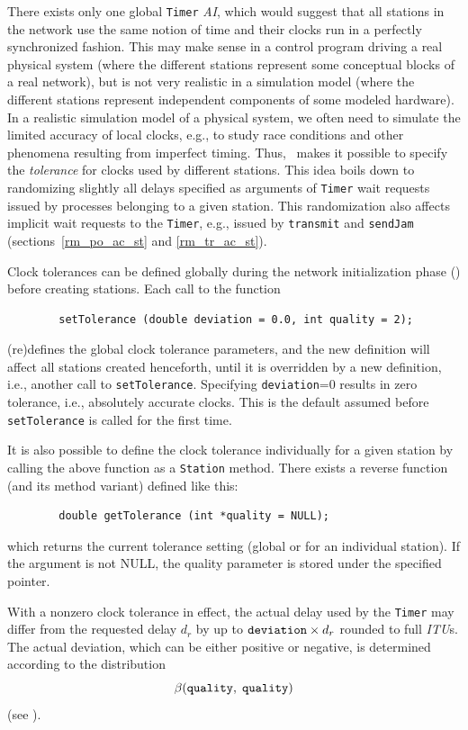 There exists only one global {\tt Timer} {\em AI}, which would suggest that all
stations in the network use the same notion of time and their clocks run
in a perfectly synchronized fashion.
This may make sense in a control program driving a real physical system
(where the different stations represent some conceptual blocks of a real
network),
but is not very realistic in a simulation model (where the different stations
represent independent components of some modeled hardware).
In a realistic simulation model of a physical system, we often need to
simulate the limited accuracy of local clocks, e.g., to study race
conditions and other phenomena resulting from imperfect timing.
Thus, \smurph\ makes it possible to specify the {\em tolerance\/} for clocks
used by different stations.
This idea boils down to randomizing slightly all delays specified as
arguments of {\tt Timer} wait requests issued by processes belonging to a
given station.
This randomization also affects implicit wait requests to the {\tt Timer},
e.g., issued by {\tt transmit} and {\tt sendJam}
(sections~\ref{rm_po_ac_st} and \ref{rm_tr_ac_st}).

Clock tolerances can be defined globally during the network initialization
phase () before creating stations.
Each call to the function
\begin{verbatim}
        setTolerance (double deviation = 0.0, int quality = 2);
\end{verbatim}
(re)defines the global clock tolerance parameters, and the new definition
will affect all stations
created henceforth, until it is overridden by a new definition, i.e.,
another call to {\tt setTolerance}.
Specifying {\tt deviation}=0 results in
zero tolerance, i.e., absolutely accurate clocks.
This is the default assumed before {\tt setTolerance} is called for the first
time.

It is also possible to define the clock tolerance individually for a given
station by calling the above function as a {\tt Station} method.
There exists a reverse function (and its method variant) defined like this:
\begin{verbatim}
        double getTolerance (int *quality = NULL);
\end{verbatim}
\noindent
which returns the current tolerance setting (global or for an individual
station).
If the argument is not NULL, the quality parameter is stored under the
specified pointer.

With a nonzero clock tolerance in effect, the actual delay used by the
{\tt Timer} may differ from the requested delay $d_r$
by up to 
${\tt deviation} \times d_r$ rounded to full {\em ITU\/}s.
The actual deviation, which can be either positive or negative,
is determined according to the distribution
\[
\beta ({\tt quality},\;{\tt quality})
\]
(see ).


